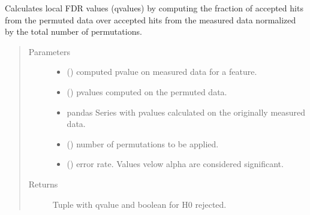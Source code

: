 \documentclass[letterpaper,10pt,english]{sphinxmanual}
\begin{document}
\begin{fulllineitems}
\label{\detokenize{_autosummary/analytics_core.analytics:analytics_core.analytics.analytics.get_counts_permutation_fdr}}
Calculates local FDR values (q\sphinxhyphen{}values) by computing the fraction of accepted hits from the permuted data over accepted hits from the measured data normalized by the total number of permutations.
\begin{quote}\begin{description}
\item[{Parameters}] \leavevmode\begin{itemize}
\item {} 
 () \textendash{} computed p\sphinxhyphen{}value on measured data for a feature.

\item {} 
 () \textendash{} p\sphinxhyphen{}values computed on the permuted data.

\item {} 
 \textendash{} pandas Series with p\sphinxhyphen{}values calculated on the originally measured data.

\item {} 
 () \textendash{} number of permutations to be applied.

\item {} 
 () \textendash{} error rate. Values velow alpha are considered significant.

\end{itemize}

\item[{Returns}] \leavevmode
Tuple with q\sphinxhyphen{}value and boolean for H0 rejected.


\end{description}
\end{quote}
\end{fulllineitems}
\end{document}
